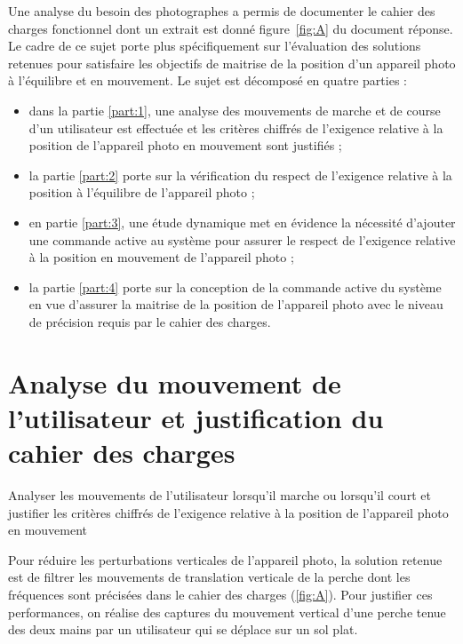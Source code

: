 Une analyse du besoin des photographes a permis de documenter le cahier des charges fonctionnel dont un extrait est donné figure~\ref{fig:A} du document réponse. Le cadre de ce sujet porte plus spécifiquement sur l'évaluation des solutions retenues pour satisfaire les objectifs de maitrise de la position d'un appareil photo à l'équilibre et en mouvement. Le sujet est décomposé en quatre parties :

\begin{itemize}
  \item dans la partie \ref{part:1}, une analyse des mouvements de marche et de course d'un utilisateur est effectuée et les critères chiffrés de l'exigence relative à la position de l'appareil photo en mouvement sont justifiés ;
  \item la partie \ref{part:2} porte sur la vérification du respect de l'exigence relative à la position à l'équilibre de l'appareil photo ;
  \item en partie \ref{part:3}, une étude dynamique met en évidence la nécessité d'ajouter une commande active au système pour assurer le respect de l'exigence relative à la position en mouvement de l'appareil photo ;
  \item la partie \ref{part:4} porte sur la conception de la commande active du système en vue d'assurer la maitrise de la position de l'appareil photo avec le niveau de précision requis par le cahier des charges.
\end{itemize}

\fi

\section{\label{part:1}Analyse du mouvement de l'utilisateur et justification du cahier des charges }

\ifprof
\else
\begin{obj}
Analyser les mouvements de l’utilisateur lorsqu’il marche ou lorsqu’il court et justifier les critères
chiffrés de l’exigence relative à la position de l’appareil photo en mouvement
\end{obj}



Pour réduire les perturbations verticales de l'appareil photo, la solution retenue est de filtrer les mouvements de translation verticale de la perche dont les fréquences sont précisées dans le cahier des charges (\ref{fig:A}). Pour justifier ces performances, on réalise des captures du mouvement vertical d'une perche tenue des deux mains par un utilisateur qui se déplace sur un sol plat.


